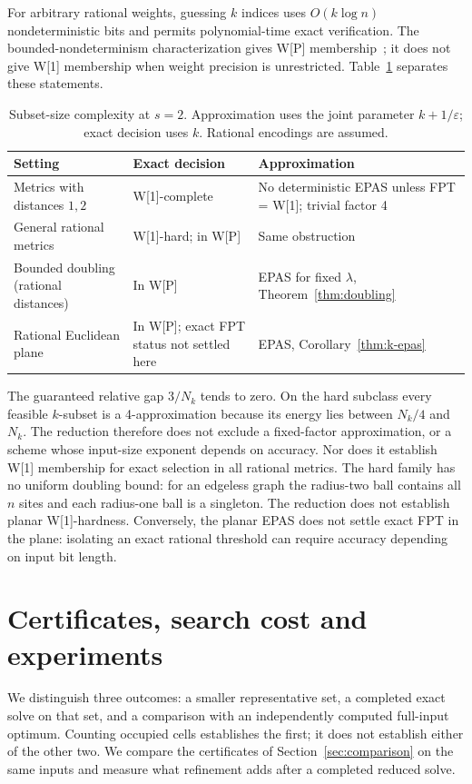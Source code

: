 \documentclass[a4paper,12pt]{article}
\numberwithin{equation}{section}
\begin{document}
For arbitrary rational weights, guessing $k$ indices uses $O(k\log n)$ nondeterministic bits and
permits polynomial-time exact verification. The bounded-nondeterminism characterization gives W[P]
membership~\cite{cygan2015}; it does not give W[1] membership when weight precision is
unrestricted. Table~\ref{tab:complexity} separates these statements.

\begin{table}[t]\centering\small
\caption{Subset-size complexity at $s=2$. Approximation uses the joint parameter $k+1/\varepsilon$; exact decision uses $k$. Rational encodings are assumed.}\label{tab:complexity}
\begin{tabular}{@{}p{.27\linewidth}p{.30\linewidth}p{.35\linewidth}@{}}\toprule
Setting & Exact decision & Approximation\\\midrule
Metrics with distances $1,2$ & W[1]-complete & No deterministic EPAS unless FPT = W[1]; trivial factor 4\\
General rational metrics & W[1]-hard; in W[P] & Same obstruction\\
Bounded doubling (rational distances) & In W[P] & EPAS for fixed $\lambda$, Theorem~\ref{thm:doubling}\\
Rational Euclidean plane & In W[P]; exact FPT status not settled here & EPAS, Corollary~\ref{thm:k-epas}\\\bottomrule
\end{tabular}
\end{table}

The guaranteed relative gap $3/N_k$ tends to zero. On the hard subclass every feasible
$k$-subset is a 4-approximation because its energy lies between $N_k/4$ and $N_k$. The reduction
therefore does not exclude a fixed-factor approximation, or a scheme whose input-size exponent
depends on accuracy. Nor does it establish W[1] membership for exact selection in all rational
metrics. The hard family has no uniform doubling bound: for an edgeless graph the radius-two
ball contains all $n$ sites and each radius-one ball is a singleton. The reduction does not
establish planar W[1]-hardness. Conversely, the planar EPAS does not settle exact FPT in the
plane: isolating an exact rational threshold can require accuracy depending on input bit length.

\section{Certificates, search cost and experiments}\label{sec:experiments}
We distinguish three outcomes: a smaller representative set, a completed exact solve on that set,
and a comparison with an independently computed full-input optimum. Counting occupied cells
establishes the first; it does not establish either of the other two. We compare the certificates
of Section~\ref{sec:comparison} on the same inputs and measure what refinement adds after a
completed reduced solve.
\end{document}
